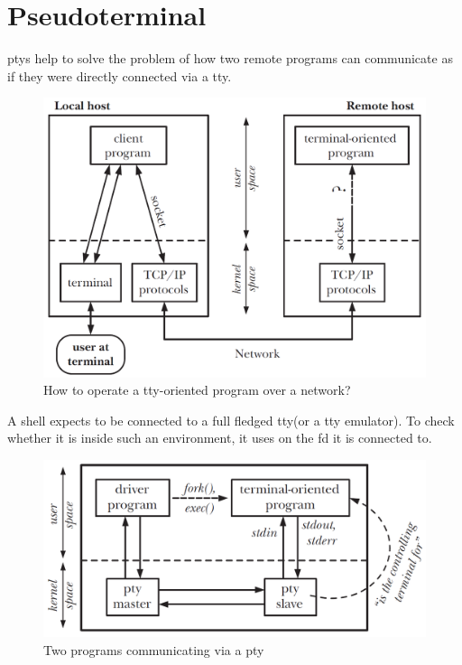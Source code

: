 \documentclass[10pt,a4paper,titlepage,twoside,english,final]{zhawreprt}
\begin{document}
\section{Pseudoterminal}\label{sec:Pseudoterminal}
\glspl{pty} help to solve the problem of how two remote programs can communicate as if they were directly connected via a \gls{tty}.\\
\begin{figure}[ht]
\includegraphics[width=\textwidth]{PseudoterminalProblem}
\caption{How to operate a \gls{tty}-oriented program over a network?\citep[p.1376]{KerriskTLPI}}
\label{fig:HowToOperateTtyOrientedProgramOverNetwork}
\end{figure}
A \gls{shell} expects to be connected to a full fledged \gls{tty}(or a \gls{tty} emulator). To check whether it is inside such an environment, it uses \cite{isatty} on the \gls{fd} it is connected to.
\begin{figure}[ht]
\includegraphics[width=\textwidth]{Pseudoterminal}
\caption{Two programs communicating via a \gls{pty}\citep[p.1377]{KerriskTLPI}}
\label{fig:TwoProgramsCommunicatingViaAPty}
\end{figure}
\end{document}
